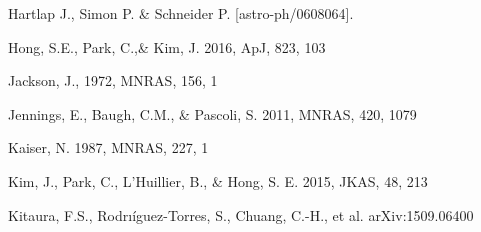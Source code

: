 \documentclass[iop]{emulateapj}
\begin{document}
\begin{thebibliography}{}







Hartlap J., Simon P. \& Schneider P. [astro-ph/0608064].


Hong, S.E., Park, C.,\&  Kim, J. 2016, ApJ, 823, 103

Jackson, J., 1972, MNRAS, 156, 1

Jennings, E., Baugh, C.M., \& Pascoli, S. 2011, MNRAS, 420, 1079  



Kaiser, N. 1987, MNRAS, 227, 1




Kim, J., Park, C., L'Huillier, B., \& Hong, S. E. 2015, JKAS, 48, 213


Kitaura, F.S., Rodrı\'{i}guez-Torres, S., Chuang, C.-H., et al. arXiv:1509.06400


\end{thebibliography}
\end{document}

